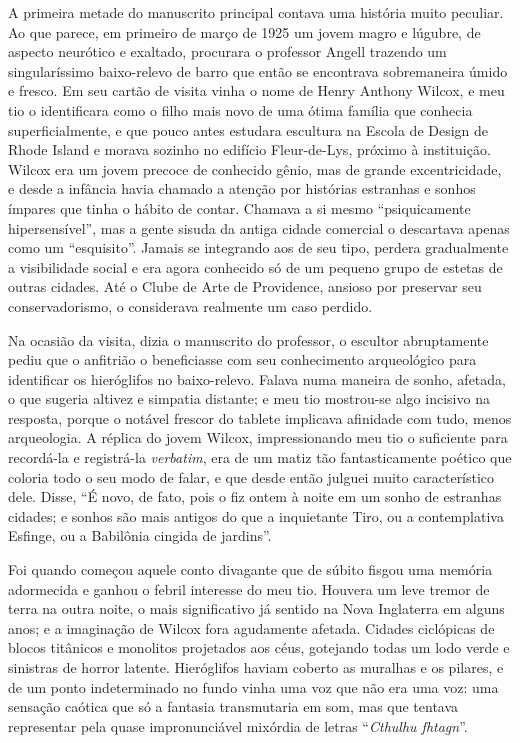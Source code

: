 A primeira metade do manuscrito principal contava uma história muito
peculiar. Ao que parece, em primeiro de março de 1925 um jovem magro e
lúgubre, de aspecto neurótico e exaltado, procurara o professor Angell
trazendo um singularíssimo baixo-relevo de barro que então se encontrava
sobremaneira úmido e fresco. Em seu cartão de visita vinha o nome de
Henry Anthony Wilcox, e meu tio o identificara como o filho mais novo de
uma ótima família que conhecia superficialmente, e que pouco antes 
estudara escultura na Escola de Design de Rhode Island e morava sozinho no
edifício Fleur-de-Lys, próximo à instituição. Wilcox era um jovem
precoce de conhecido gênio, mas de grande excentricidade, e desde
a infância havia chamado a atenção por histórias estranhas e sonhos ímpares
que tinha o hábito de contar. Chamava a si mesmo ``psiquicamente
hipersensível'', mas a gente sisuda da antiga cidade comercial o
descartava apenas como um ``esquisito''. Jamais se integrando aos de seu
tipo, perdera gradualmente a visibilidade social e era agora conhecido
só de um pequeno grupo de estetas de outras cidades. Até o Clube de Arte
de Providence, ansioso por preservar seu conservadorismo, o considerava
realmente um caso perdido.

Na ocasião da visita, dizia o manuscrito do professor, o escultor
abruptamente pediu que o anfitrião o beneficiasse com seu conhecimento
arqueológico para identificar os hieróglifos no baixo-relevo. Falava
numa maneira de sonho, afetada, o que sugeria altivez e simpatia
distante; e meu tio mostrou-se algo incisivo na resposta, porque o
notável frescor do tablete implicava afinidade com tudo, menos
arqueologia. A réplica do jovem Wilcox, impressionando meu tio o
suficiente para recordá-la e registrá-la \emph{verbatim}, era de um
matiz tão fantasticamente poético que coloria todo o seu modo de falar,
e que desde então julguei muito característico dele. Disse, ``É novo, de
fato, pois o fiz ontem à noite em um sonho de estranhas cidades; e
sonhos são mais antigos do que a inquietante Tiro, ou a contemplativa
Esfinge, ou a Babilônia cingida de jardins''.

Foi quando começou aquele conto divagante que de súbito fisgou uma
memória adormecida e ganhou o febril interesse do meu tio. Houvera um
leve tremor de terra na outra noite, o mais significativo já sentido na
Nova Inglaterra em alguns anos; e a imaginação de Wilcox fora agudamente afetada. 
Cidades ciclópicas de blocos titânicos e monolitos
projetados aos céus, gotejando todas um lodo verde e sinistras de horror
latente. Hieróglifos haviam coberto as muralhas e os pilares, e de um
ponto indeterminado no fundo vinha uma voz que não era uma voz: uma
sensação caótica que só a fantasia transmutaria em som, mas que tentava
representar pela quase impronunciável mixórdia de letras ``\emph{Cthulhu
fhtagn}''.

